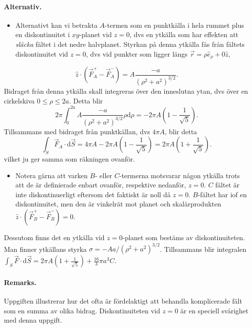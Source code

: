 \documentclass[%
oneside,                 %
final,                   %
10pt]{article}
\newenvironment{doconceexercise}{}{}
\begin{document}
\begin{doconceexercise}
\paragraph{Alternativ.}
\begin{itemize}
\item Alternativt kan vi betrakta $A$-termen som en punktkälla i hela rummet plus en diskontinuitet i $xy$-planet vid $z=0$, dvs en ytkälla som har effekten att \emph{släcka} fältet i det nedre halvplanet. Styrkan på denna ytkälla fås från fältets diskontinuitet vid $z=0$, dvs vid punkter som ligger längs $\vec{r} = \rho \hat{e}_\rho + 0 \hat{z}$,
\end{itemize}

\noindent
$$
\hat{z} \cdot \left( \vec{F}_A^+ - \vec{F}_A^- \right) = 
A \frac{-a}{(\rho^2 + a^2)^{3/2}}.
$$ 
Bidraget från denna ytkälla skall integreras över den inneslutna ytan, dvs över en cirkelskiva $0 \leq \rho \leq 2a$. Detta blir
$$
2 \pi \int_0^{2a} A \frac{- a}{(\rho^2 + a^2)^{3/2}} \rho \mbox{d}\rho = -2 \pi A \left( 1 -\frac{1}{\sqrt{5}} \right).
$$
Tillsammans med bidraget från punktkällan, dvs $4 \pi A$, blir detta
$$
\int_S \vec{F}_A \cdot \mbox{d}\vec{S} = 4 \pi A  -  2 \pi A \left( 1 -\frac{1}{\sqrt{5}} \right) = 2 \pi A \left( 1 + \frac{1}{\sqrt{5}} \right).
$$
vilket ju ger samma som räkningen ovanför.

\begin{itemize}
\item Notera gärna att varken $B$- eller $C$-termerna motsvarar någon ytkälla trots att de är definierade enbart ovanför, respektive nedanför, $z=0$. $C$ fältet är inte diskontinuerligt eftersom det faktiskt är noll då $z=0$. $B$-fältet har iof en diskontinuitet, men den är vinkelrät mot planet och skalärprodukten $\hat{z} \cdot \left( \vec{F}_B^+ - \vec{F}_B^- \right) = 0$. 
\end{itemize}

\noindent
Dessutom finns det en ytkälla vid $z=0$-planet som bestäms av
diskontinuiteten. Man finner ytkällans styrka $\sigma = -A a / (\rho^2
+ a^2)^{3/2}$.
Tillsammans blir integralen $\int_S \vec{F} \cdot \mbox{d}\vec{S} = 2
\pi A \left(1 + \frac{1}{\sqrt{5}} \right) + \frac{16}{3} \pi a^3 C$.



\paragraph{Remarks.}
Uppgiften illustrerar hur det ofta är fördelaktigt att behandla komplicerade fält som en summa av olika bidrag. Diskontinuiteten vid $z=0$ är en speciell svårighet med denna uppgift.


\end{doconceexercise}



\end{document}
